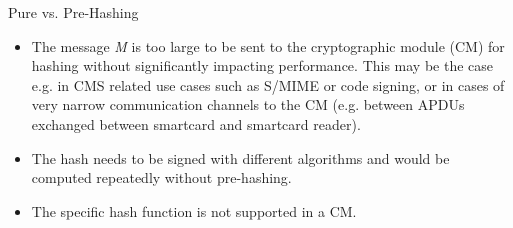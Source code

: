 \begin{minipage}[t]{0.28\textwidth}
\begin{algorithmbox}{Pure vs. Pre-Hashing}
\begin{itemize}[leftmargin=*]
            \begin{itemize}[leftmargin=*]
                \setlength\itemsep{0em}
                \item The message {\itshape M} is too large to be sent to the cryptographic module (CM) for hashing without significantly impacting performance. This may be the case e.g. in CMS related use cases such as S/MIME or code signing, or in cases of very narrow communication channels to the CM (e.g. between APDUs exchanged between smartcard and smartcard reader).
                \item The hash needs to be signed with different algorithms and would be computed repeatedly without pre-hashing.
                \item The specific hash function is not supported in a CM.
            \end{itemize}
        \end{itemize}
    \end{algorithmbox}
\end{minipage}

